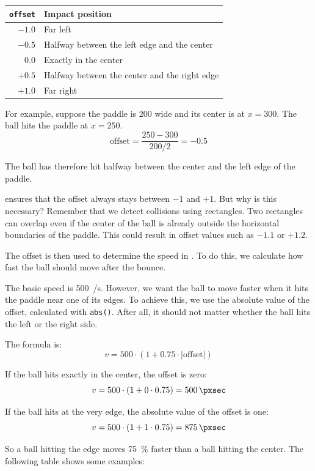 \begin{center}
	\begin{tabular}{rl}
		\toprule
		\texttt{offset} & Impact position \\
		\midrule
		$-1.0$ & Far left \\
		$-0.5$ & Halfway between the left edge and the center \\
		$0.0$  & Exactly in the center \\
		$+0.5$ & Halfway between the center and the right edge \\
		$+1.0$ & Far right \\
		\bottomrule
	\end{tabular}
\end{center}

For example, suppose the paddle is \SI{200}{\pixel} wide and its center is at $x=300$. The ball hits the paddle at $x=250$.
\[
	\text{offset} = \frac{250-300}{200/2} = -0.5
\]

The ball has therefore hit halfway between the center and the left edge of the paddle.


 ensures that the offset always stays between $-1$ and $+1$. But why is this necessary? Remember that we detect collisions using rectangles. Two rectangles can overlap even if the center of the ball is already outside the horizontal boundaries of the paddle. This could result in offset values such as $-1.1$ or $+1.2$.

The offset is then used to determine the speed in . To do this, we calculate how fast the ball should move after the bounce.

The basic speed is \SI{500}{\pixel/\second}. However, we want the ball to move faster when it hits the paddle near one of its edges. To achieve this, we use the absolute value of the offset, calculated with \texttt{abs()}. After all, it should not matter whether the ball hits the left or the right side.

The formula is:
\[
	v = 500 \cdot (1 + 0.75 \cdot |\text{offset}|)
\]

If the ball hits exactly in the center, the offset is zero:
\[
	v = 500 \cdot (1 + 0 \cdot 0.75) = \SI{500}{\pxsec}
\]

If the ball hits at the very edge, the absolute value of the offset is one:
\[
	v = 500 \cdot (1 + 1 \cdot 0.75) = \SI{875}{\pxsec}
\]

So a ball hitting the edge moves \SI{75}{\percent} faster than a ball hitting the center. The following table shows some examples:

